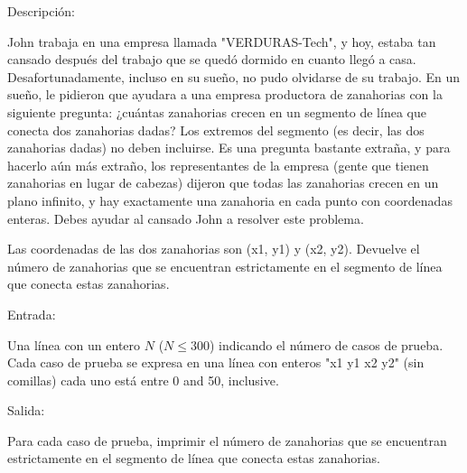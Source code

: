 Descripción:

John trabaja en una empresa llamada "VERDURAS-Tech", y hoy, estaba tan cansado después del trabajo que se quedó dormido en cuanto llegó a casa. Desafortunadamente, incluso en su sueño, no pudo olvidarse de su trabajo. En un sueño, le pidieron que ayudara a una empresa productora de zanahorias con la siguiente pregunta: ¿cuántas zanahorias crecen en un segmento de línea que conecta dos zanahorias dadas? Los extremos del segmento (es decir, las dos zanahorias dadas) no deben incluirse. Es una pregunta bastante extraña, y para hacerlo aún más extraño, los representantes de la empresa (gente que tienen zanahorias en lugar de cabezas) dijeron que todas las zanahorias crecen en un plano infinito, y hay exactamente una zanahoria en cada punto con coordenadas enteras. Debes ayudar al cansado John a resolver este problema.

Las coordenadas de las dos zanahorias son (x1, y1) y (x2, y2). Devuelve el número de zanahorias que se encuentran estrictamente en el segmento de línea que conecta estas zanahorias.

Entrada:

Una línea con un entero $N$ ($N \leq 300$) indicando el número de casos de prueba.
Cada caso de prueba se expresa en una línea con enteros "x1 y1 x2 y2" (sin comillas) cada uno está entre 0 and 50, inclusive.


Salida:

Para cada caso de prueba, imprimir el número de zanahorias que se encuentran estrictamente en el segmento de línea que conecta estas zanahorias.